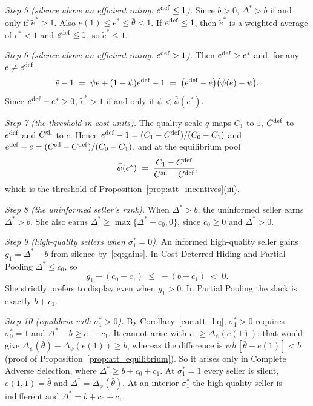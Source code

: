 \emph{Step 5 (silence above an efficient rating: $e^{\rm def}\le1$).} Since $b>0$, $\Delta^*>b$ if and only if $\tilde e^*>1$. Also $e(1)\le e^*\le\bar\theta<1$. If $e^{\rm def}\le1$, then $\tilde e^*$ is a weighted average of $e^*<1$ and $e^{\rm def}\le1$, so $\tilde e^*\le1$.

\emph{Step 6 (silence above an efficient rating: $e^{\rm def}>1$).} Then $e^{\rm def}>e^*$ and, for any $e\neq e^{\rm def}$,
\begin{equation*}
    \tilde e-1\;=\;\psi e+(1-\psi)e^{\rm def}-1\;=\;\big(e^{\rm def}-e\big)\big(\bar\psi(e)-\psi\big).
\end{equation*}
Since $e^{\rm def}-e^*>0$, $\tilde e^*>1$ if and only if $\psi<\bar\psi(e^*)$.

\emph{Step 7 (the threshold in cost units).} The quality scale $q$ maps $C_1$ to $1$, $C^{\rm def}$ to $e^{\rm def}$ and $\bar C^{\rm sil}$ to $e$. Hence $e^{\rm def}-1=(C_1-C^{\rm def})/(C_0-C_1)$ and $e^{\rm def}-e=(\bar C^{\rm sil}-C^{\rm def})/(C_0-C_1)$, and at the equilibrium pool
\begin{equation*}
    \bar\psi(e^*)\;=\;\frac{C_1-C^{\rm def}}{\bar C^{\rm sil}-C^{\rm def}},
\end{equation*}
which is the threshold of Proposition~\ref{prop:att_incentives}(iii).

\emph{Step 8 (the uninformed seller's rank).} When $\Delta^*>b$, the uninformed seller earns $\Delta^*>b$. She also earns $\Delta^*\ge\max\{\Delta^*-c_0,0\}$, since $c_0\ge0$ and $\Delta^*>0$.

\emph{Step 9 (high-quality sellers when $\sigma_1^*=0$).} An informed high-quality seller gains $g_1=\Delta^*-b$ from silence by~\eqref{eq:gains}. In Cost-Deterred Hiding and Partial Pooling $\Delta^*\le c_0$, so
\begin{equation*}
    g_1-(c_0+c_1)\;\le\;-(b+c_1)\;<\;0 .
\end{equation*}
She strictly prefers to display even when $g_1>0$. In Partial Pooling the slack is exactly $b+c_1$.

\emph{Step 10 (equilibria with $\sigma_1^*>0$).} By Corollary~\ref{cor:att_hq}, $\sigma_1^*>0$ requires $\sigma_0^*=1$ and $\Delta^*-b\ge c_0+c_1$. It cannot arise with $c_0\ge\Delta_\psi(e(1))$: that would give $\Delta_\psi(\bar\theta)-\Delta_\psi(e(1))\ge b$, whereas the difference is $\psi\,b\,[\bar\theta-e(1)]<b$ (proof of Proposition~\ref{prop:att_equilibrium}). So it arises only in Complete Adverse Selection, where $\Delta^*\ge b+c_0+c_1$. At $\sigma_1^*=1$ every seller is silent, $e(1,1)=\bar\theta$ and $\Delta^*=\Delta_\psi(\bar\theta)$. At an interior $\sigma_1^*$ the high-quality seller is indifferent and $\Delta^*=b+c_0+c_1$.
